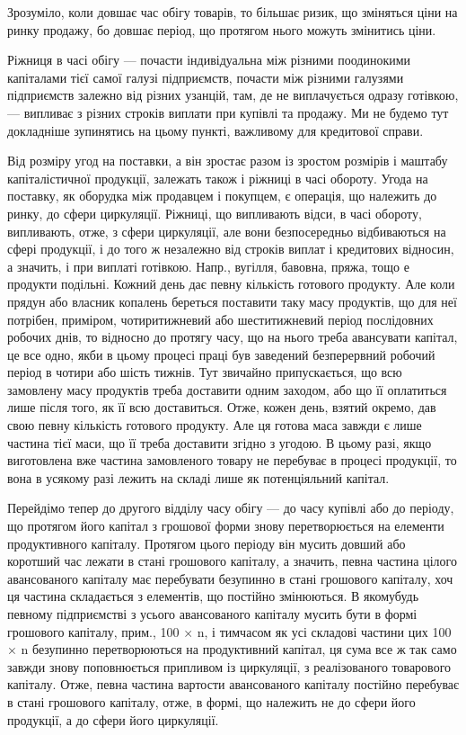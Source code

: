 Зрозуміло, коли довшає час обігу товарів, то більшає ризик, що
зміняться ціни на ринку продажу, бо довшає період, що протягом нього
можуть змінитись ціни.

Ріжниця в часі обігу — почасти індивідуальна між різними поодинокими
капіталами тієї самої галузі підприємств, почасти між різними галузями
підприємств залежно від різних узанцій, там, де не виплачується
одразу готівкою, — випливає з різних строків виплати при купівлі та
продажу. Ми не будемо тут докладніше зупинятись на цьому пункті,
важливому для кредитової справи.

Від розміру угод на поставки, а він зростає разом із зростом розмірів
і маштабу капіталістичної продукції, залежать також і ріжниці в часі
обороту. Угода на поставку, як оборудка між продавцем і покупцем, є
операція, що належить до ринку, до сфери циркуляції. Ріжниці, що випливають
відси, в часі обороту, випливають, отже, з сфери циркуляції,
але вони безпосередньо відбиваються на сфері продукції, і до того ж
незалежно від строків виплат і кредитових відносин, а значить, і при виплаті
готівкою. Напр., вугілля, бавовна, пряжа, тощо е продукти подільні.
Кожний день дає певну кількість готового продукту. Але коли прядун
або власник копалень береться поставити таку масу продуктів, що для
неї потрібен, приміром, чотиритижневий або шеститижневий період послідовних
робочих днів, то відносно до протягу часу, що на нього треба
авансувати капітал, це все одно, якби в цьому процесі праці був заведений
безперервний робочий період в чотири або шість тижнів. Тут звичайно
припускається, що всю замовлену масу продуктів треба доставити
одним заходом, або що її оплатиться лише після того, як її всю доставиться.
Отже, кожен день, взятий окремо, дав свою певну кількість готового
продукту. Але ця готова маса завжди є лише частина тієї маси,
що її треба доставити згідно з угодою. В цьому разі, якщо виготовлена
вже частина замовленого товару не перебуває в процесі продукції, то
вона в усякому разі лежить на складі лише як потенціяльний капітал.

Перейдімо тепер до другого відділу часу обігу — до часу купівлі або
до періоду, що протягом його капітал з грошової форми знову перетворюється
на елементи продуктивного капіталу. Протягом цього періоду
він мусить довший або коротший час лежати в стані грошового капіталу,
а значить, певна частина цілого авансованого капіталу має перебувати
безупинно в стані грошового капіталу, хоч ця частина складається з елементів,
що постійно змінюються. В якомубудь певному підприємстві з
усього авансованого капіталу мусить бути в формі грошового капіталу,
прим., 100 × n, і тимчасом як усі складові частини цих 100 × n безупинно перетворюються на продуктивний капітал, ця сума
все ж так само завжди знову поповнюється припливом із циркуляції, з реалізованого
товарового капіталу. Отже, певна частина вартости авансованого
капіталу постійно перебуває в стані грошового капіталу, отже, в формі,
що належить не до сфери його продукції, а до сфери його циркуляції.

